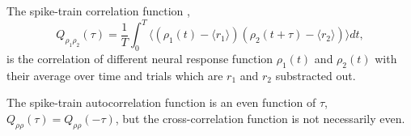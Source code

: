 \begin{defn}
The spike-train correlation function ,  
\begin{equation}
    Q_{\rho_1 \rho_2}(\tau)=\frac{1}{T}\int^T_0 \langle (\rho_1(t)-\langle r_1 \rangle)(\rho_2(t+\tau)-\langle r_2\rangle)\rangle dt, 
    \label{equ:1.35}
\end{equation}
    is the correlation of different neural response function $\rho_1(t)$ and $\rho_2(t)$ with their average over time and trials which are $r_1$ and $r_2$ substracted out.
\end{defn}

\begin{rem}
    The spike-train autocorrelation function is an even function of $\tau$, $ Q_{\rho\rho}(\tau)=Q_{\rho\rho}(-\tau)$, but the cross-correlation function is not necessarily even.
\end{rem}

